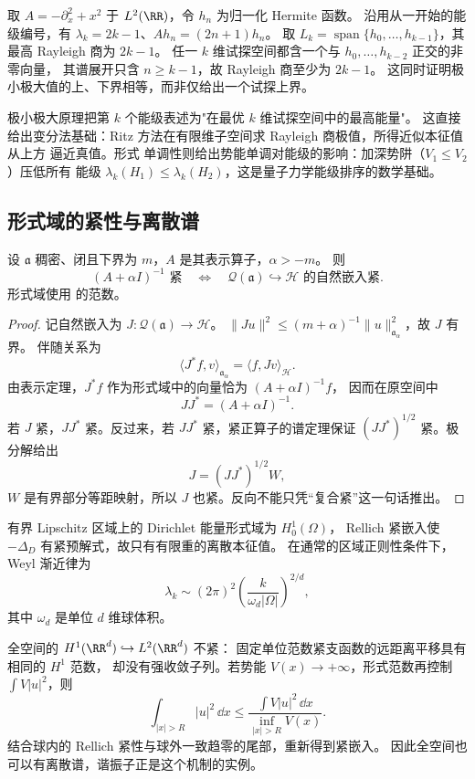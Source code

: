 \begin{example}[谐振子的变分能级]
取 $A=-\partial_x^2+x^2$ 于 $L^2(\RR)$，令 $h_n$ 为归一化 Hermite 函数。
沿用从一开始的能级编号，有 $\lambda_k=2k-1$、$Ah_n=(2n+1)h_n$。
取 $L_k=\operatorname{span}\{h_0,\dots,h_{k-1}\}$，其最高 Rayleigh 商为 $2k-1$。
任一 $k$ 维试探空间都含一个与 $h_0,\dots,h_{k-2}$ 正交的非零向量，
其谱展开只含 $n\ge k-1$，故 Rayleigh 商至少为 $2k-1$。
这同时证明极小极大值的上、下界相等，而非仅给出一个试探上界。
\end{example}

极小极大原理把第 $k$ 个能级表述为"在最优 $k$ 维试探空间中的最高能量"。
这直接给出变分法基础：Ritz 方法在有限维子空间求 Rayleigh 商极值，所得近似本征值从上方
逼近真值。形式 单调性则给出势能单调对能级的影响：加深势阱（$V_1\le V_2$）压低所有
能级 $\lambda_k(H_1)\le\lambda_k(H_2)$，这是量子力学能级排序的数学基础。

\subsection{形式域的紧性与离散谱}

\begin{proposition}[紧预解式与形式域的紧嵌入]
设 $\mathfrak a$ 稠密、闭且下界为 $m$，$A$ 是其表示算子，$\alpha>-m$。
则
\begin{equation}\label{eq:math-sl-compact-form-embedding}
(A+\alpha I)^{-1}\text{ 紧}
\quad\Longleftrightarrow\quad
\mathcal Q(\mathfrak a)\hookrightarrow\mathcal H
\text{ 的自然嵌入紧}.
\end{equation}
形式域使用 的范数。
\end{proposition}
\begin{proof}
记自然嵌入为 $J:\mathcal Q(\mathfrak a)\to\mathcal H$。
$\|Ju\|^2\le(m+\alpha)^{-1}\|u\|_{\mathfrak a_\alpha}^2$，故 $J$ 有界。
伴随关系为
\[
\langle J^*f,v\rangle_{\mathfrak a_\alpha}
=\langle f,Jv\rangle_{\mathcal H}.
\]
由表示定理，$J^*f$ 作为形式域中的向量恰为 $(A+\alpha I)^{-1}f$，
因而在原空间中
\[
JJ^*=(A+\alpha I)^{-1}.
\]
若 $J$ 紧，$JJ^*$ 紧。反过来，若 $JJ^*$ 紧，紧正算子的谱定理保证
$(JJ^*)^{1/2}$ 紧。极分解给出
\[
J=(JJ^*)^{1/2}W,
\]
$W$ 是有界部分等距映射，所以 $J$ 也紧。反向不能只凭“复合紧”这一句话推出。
\end{proof}

\begin{example}[受限区域与增长势]
有界 Lipschitz 区域上的 Dirichlet 能量形式域为 $H_0^1(\Omega)$，
Rellich 紧嵌入使 $-\Delta_D$ 有紧预解式，故只有有限重的离散本征值。
在通常的区域正则性条件下，Weyl 渐近律为
\[
\lambda_k\sim(2\pi)^2
\left(\frac{k}{\omega_d|\Omega|}\right)^{2/d},
\]
其中 $\omega_d$ 是单位 $d$ 维球体积。

全空间的 $H^1(\RR^d)\hookrightarrow L^2(\RR^d)$ 不紧：
固定单位范数紧支函数的远距离平移具有相同的 $H^1$ 范数，
却没有强收敛子列。若势能 $V(x)\to+\infty$，形式范数再控制
$\int V|u|^2$，则
\[
\int_{|x|>R}|u|^2\,\dd x
\le\frac{\int V|u|^2\,\dd x}{\inf_{|x|>R}V(x)}.
\]
结合球内的 Rellich 紧性与球外一致趋零的尾部，重新得到紧嵌入。
因此全空间也可以有离散谱，谐振子正是这个机制的实例。
\end{example}

